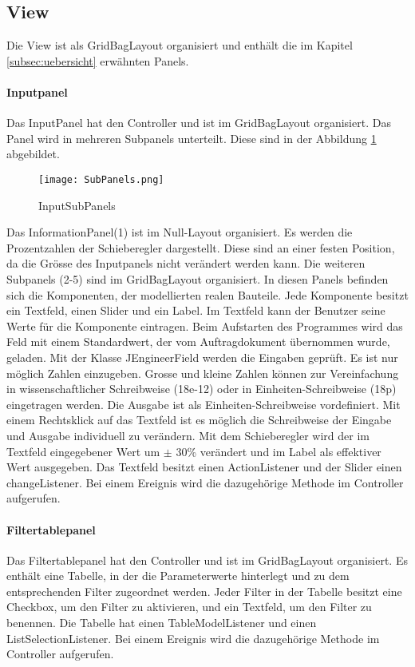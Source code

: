\subsection{View} \label{subsec:view}
Die View ist als GridBagLayout organisiert und enthält die im Kapitel \ref{subsec:uebersicht} erwähnten Panels.
\bigskip

\paragraph{Inputpanel} \label{par:inputpanel}
Das InputPanel hat den Controller und ist im GridBagLayout organisiert. Das Panel wird in mehreren Subpanels unterteilt. Diese sind in der Abbildung  \ref{fig:subpanels} abgebildet. 

\begin{figure}[H]
	\centering
	\texttt{[image: SubPanels.png]}
	\caption{InputSubPanels}
	\label{fig:subpanels}
\end{figure} 

Das InformationPanel(1) ist im Null-Layout organisiert. Es werden die Prozentzahlen der Schieberegler dargestellt. Diese sind an einer festen Position, da die Grösse des Inputpanels nicht verändert werden kann. Die weiteren Subpanels (2-5) sind im GridBagLayout organisiert. In diesen Panels befinden sich die Komponenten, der modellierten realen Bauteile. Jede Komponente besitzt ein Textfeld, einen Slider und ein Label. Im Textfeld kann der Benutzer seine Werte für die Komponente eintragen. Beim Aufstarten des Programmes wird das Feld mit einem Standardwert, der vom Auftragdokument übernommen wurde, geladen. Mit der Klasse JEngineerField werden die Eingaben geprüft. Es ist nur möglich Zahlen einzugeben. Grosse und kleine Zahlen können zur Vereinfachung in wissenschaftlicher Schreibweise (18e-12) oder in Einheiten-Schreibweise (18p) eingetragen werden. Die Ausgabe ist als Einheiten-Schreibweise vordefiniert. Mit einem Rechtsklick auf das Textfeld ist es möglich die Schreibweise der Eingabe und Ausgabe individuell zu verändern.
Mit dem Schieberegler wird der im Textfeld eingegebener Wert um $\pm$ 30\% verändert und im Label als effektiver Wert ausgegeben. Das Textfeld besitzt einen ActionListener und der Slider einen changeListener. Bei einem Ereignis wird die dazugehörige Methode im Controller  aufgerufen.
\bigskip

\paragraph{Filtertablepanel} \label{par:filterpanel}
Das Filtertablepanel hat den Controller und ist im GridBagLayout organisiert. Es enthält eine Tabelle, in der die Parameterwerte hinterlegt und zu dem entsprechenden Filter zugeordnet werden. Jeder Filter in der Tabelle besitzt eine Checkbox, um den Filter zu aktivieren, und ein Textfeld, um den Filter  zu benennen. Die Tabelle hat einen TableModelListener und einen ListSelectionListener. Bei einem Ereignis wird die dazugehörige Methode im Controller  aufgerufen.
\bigskip

